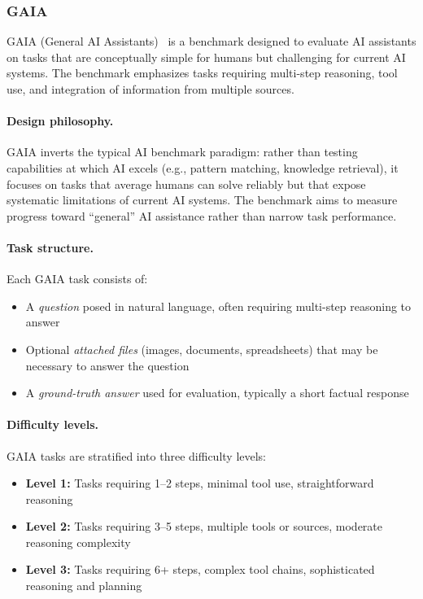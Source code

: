 \documentclass[11pt]{article}
\begin{document}
\subsubsection{GAIA}

GAIA (General AI Assistants)~\citep{mialon2023gaia} is a benchmark designed to evaluate AI assistants on tasks that are conceptually simple for humans but challenging for current AI systems.
The benchmark emphasizes tasks requiring multi-step reasoning, tool use, and integration of information from multiple sources.

\paragraph{Design philosophy.}
GAIA inverts the typical AI benchmark paradigm: rather than testing capabilities at which AI excels (e.g., pattern matching, knowledge retrieval), it focuses on tasks that average humans can solve reliably but that expose systematic limitations of current AI systems.
The benchmark aims to measure progress toward ``general'' AI assistance rather than narrow task performance.

\paragraph{Task structure.}
Each GAIA task consists of:
\begin{itemize}[leftmargin=*, topsep=2pt]
    \item A \emph{question} posed in natural language, often requiring multi-step reasoning to answer
    \item Optional \emph{attached files} (images, documents, spreadsheets) that may be necessary to answer the question
    \item A \emph{ground-truth answer} used for evaluation, typically a short factual response
\end{itemize}

\paragraph{Difficulty levels.}
GAIA tasks are stratified into three difficulty levels:
\begin{itemize}[leftmargin=*, topsep=2pt]
    \item \textbf{Level 1:} Tasks requiring 1--2 steps, minimal tool use, straightforward reasoning
    \item \textbf{Level 2:} Tasks requiring 3--5 steps, multiple tools or sources, moderate reasoning complexity
    \item \textbf{Level 3:} Tasks requiring 6+ steps, complex tool chains, sophisticated reasoning and planning
\end{itemize}
\end{document}
